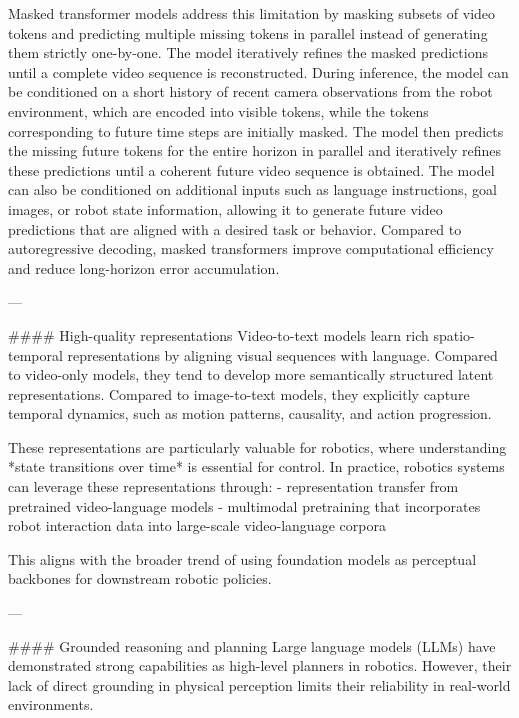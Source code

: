 Masked transformer models address this limitation by masking subsets of video tokens and predicting multiple missing tokens in parallel instead of generating them strictly one-by-one. The model iteratively refines the masked predictions until a complete video sequence is reconstructed. 
During inference, the model can be conditioned on a short history of recent camera observations from the robot environment, which are encoded into visible tokens, while the tokens corresponding to future time steps are initially masked. The model then predicts the missing future tokens for the entire horizon in parallel and iteratively refines these predictions until a coherent future video sequence is obtained.
The model can also be conditioned on additional inputs such as language instructions, goal images, or robot state information, allowing it to generate future video predictions that are aligned with a desired task or behavior.
Compared to autoregressive decoding, masked transformers improve computational efficiency and reduce long-horizon error accumulation.




















---

#### High-quality representations
Video-to-text models learn rich spatio-temporal representations by aligning visual sequences with language. Compared to video-only models, they tend to develop more semantically structured latent representations. Compared to image-to-text models, they explicitly capture temporal dynamics, such as motion patterns, causality, and action progression.

These representations are particularly valuable for robotics, where understanding *state transitions over time* is essential for control. In practice, robotics systems can leverage these representations through:
- representation transfer from pretrained video-language models
- multimodal pretraining that incorporates robot interaction data into large-scale video-language corpora

This aligns with the broader trend of using foundation models as perceptual backbones for downstream robotic policies.

---

#### Grounded reasoning and planning
Large language models (LLMs) have demonstrated strong capabilities as high-level planners in robotics. However, their lack of direct grounding in physical perception limits their reliability in real-world environments.

